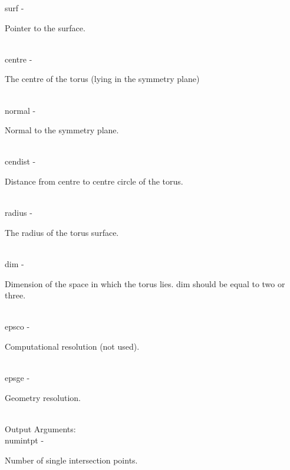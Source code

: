         \>\>    {\fov surf}\> - \>      \begin{minipg2}
                                Pointer to the surface.
                                \end{minipg2}\\
        \>\>    {\fov centre}\> - \>    \begin{minipg2}
                                The centre of the torus (lying in the symmetry
                                plane)
                                \end{minipg2}\\
        \>\>    {\fov normal}\> - \>    \begin{minipg2}
                                Normal to the symmetry plane.
                                \end{minipg2}\\
        \>\>    {\fov cendist}\> - \>   \begin{minipg2}
                                Distance from centre to centre circle of the torus.
                                \end{minipg2} \\
        \>\>    {\fov radius}\> - \>    \begin{minipg2}
                                The radius of the torus surface.
                                \end{minipg2}\\
        \>\>    {\fov di}m      \> - \> \begin{minipg2}
                                Dimension of the space in which the torus lies. dim
                                should be equal to two or three.
                                \end{minipg2}\\[0.3ex]
        \>\>    {\fov epsco}\> - \>     \begin{minipg2}
                                Computational resolution (not used).
                                \end{minipg2}\\
        \>\>    {\fov epsge}\> - \>     \begin{minipg2}
                                Geometry resolution.
                                \end{minipg2}\\
        \>Output Arguments:\\
        \>\>    {\fov numintpt}\> - \>  \begin{minipg2}
                                Number of single intersection points.
                                \end{minipg2}\\
